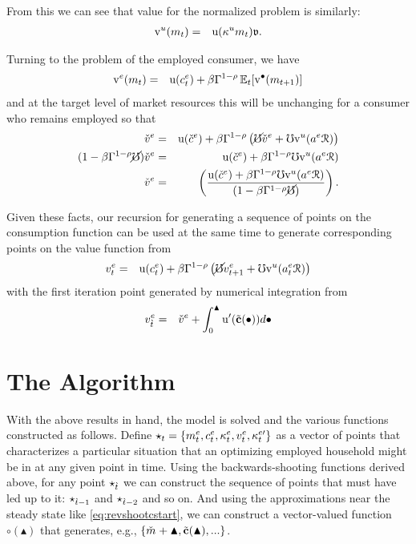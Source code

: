 \documentclass{handout}
\begin{document}
From this we can see that value for the normalized problem is similarly:
\begin{eqnarray}
  \mathrm{v}^{u}(m_{t}) & = & {\mathrm{u}}(\kappa^{u} m_{t}) \mathfrak{v}
.
\end{eqnarray}

Turning to the problem of the employed consumer, we have
\begin{eqnarray}
  \mathrm{v}^{e}(m_{t}) & = & {\mathrm{u}}(c^{e}_{t})+\beta \Gamma^{1-\rho} \operatorname{\mathbb{E}}_{t}[\mathrm{v}^{\bullet}(m_{t+1})]
\end{eqnarray}
and at the target level of market resources this will be unchanging for a consumer who
remains employed so that 
\begin{eqnarray}
  \check{v}^{e} & = & {\mathrm{u}}(\check{c}^{e})+\beta \Gamma^{1-\rho} \left(\cancel{\mho} \check{v}^{e} + \mho \mathrm{v}^{u}(a^{e} \mathcal{R})\right)
\\ (1-\beta \Gamma^{1-\rho} \cancel{\mho}) \check{v}^{e} & = & {\mathrm{u}}(\check{c}^{e})+\beta \Gamma^{1-\rho} \mho \mathrm{v}^{u}(a^{e} \mathcal{R})
\\ \check{v}^{e} & = & \left(\frac{{\mathrm{u}}(\check{c}^{e})+\beta \Gamma^{1-\rho} \mho \mathrm{v}^{u}(a^{e} \mathcal{R})}{(1-\beta \Gamma^{1-\rho} \cancel{\mho}) }\right)
.
\end{eqnarray}

Given these facts, our recursion for generating a sequence of points on the consumption
function can be used at the same time to generate corresponding points on the value function from
\begin{eqnarray}
  {v}^{e}_{t} & = & {\mathrm{u}}(c^{e}_{t})+\beta \Gamma^{1-\rho} \left(\cancel{\mho} {v}^{e}_{t+1} + \mho \mathrm{v}^{u}(a^{e}_{t} \mathcal{R})\right)
\end{eqnarray}
with the first iteration point generated by numerical integration from 
\begin{eqnarray}
  v^{e}_{\grave{t}} & = & \check{v}^{e}+\int_{0}^{\blacktriangle} {\mathrm{u}^{\prime}}(\tilde{\mathbf{c}}(\bullet)) d\bullet
\end{eqnarray}



\section{The Algorithm}

With the above results in hand, the model is solved and the various
functions constructed as follows.  Define $\star_{t} =
\{m^{e}_{t},c^{e}_{t},\kappa^{e}_{t},{v}^{e}_{t},\kappa_{t}^{e\prime}\}$ as a vector of points that
characterizes a particular situation that an optimizing employed
household might be in at any given point in time.  Using the backwards-shooting 
functions derived above, for any point $\star_{\grave{t}}$ we can construct the
sequence of points that must have led up to it: $\star_{\grave{t}-1}$ and
$\star_{\grave{t}-2}$ and so on.  And using the approximations near the
steady state like \eqref{eq:revshootcstart}, we can construct 
a vector-valued function $\pmb{\circ}(\blacktriangle)$ that generates, 
e.g., $\{\mTarg^{\null}+\blacktriangle,\tilde{\mathbf{c}}(\blacktriangle), ... \}$.
\end{document}
